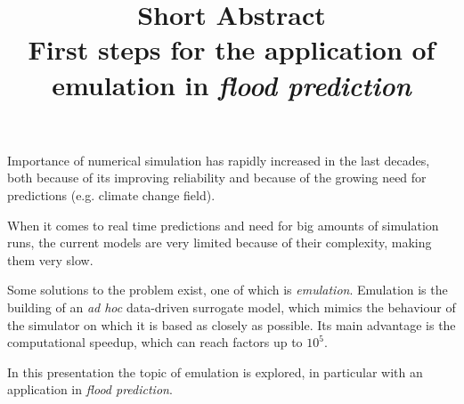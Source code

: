 \documentclass{article}
\title{%
  \bf{Short Abstract}\\%
  \large First steps for the application of\\
  emulation in \emph{flood prediction}}
\author{}
\date{}
\begin{document}
\maketitle
\thispagestyle{fancy}

Importance of numerical simulation has rapidly increased in the last decades, both because of its improving reliability and because of the growing need for predictions (e.g. climate change field).

When it comes to real time predictions and need for big amounts of simulation runs, the current models are very limited because of their complexity, making them very slow.

Some solutions to the problem exist, one of which is \emph{emulation}. 
Emulation is the building of an \emph{ad hoc} data-driven surrogate model, which mimics the behaviour of the simulator on which it is based as closely as possible. Its main advantage is the computational speedup, which can reach factors up to $10^5$.

In this presentation the topic of emulation is explored, in particular with an application in \emph{flood prediction}.
\end{document}
